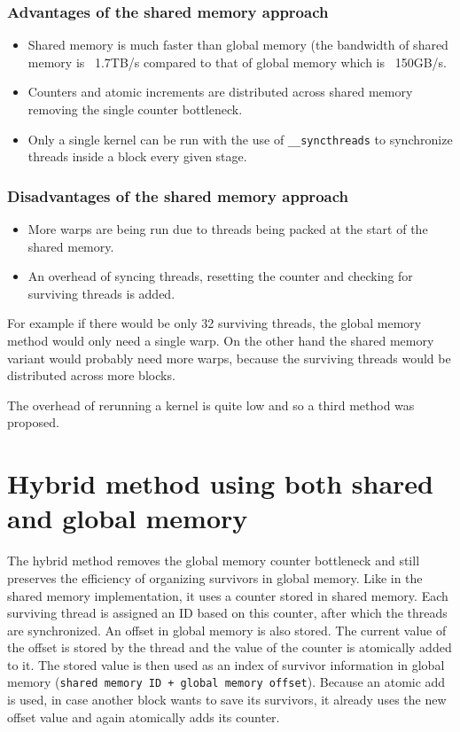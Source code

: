 \subsubsection{Advantages of the shared memory approach}

\begin{itemize}
	\item Shared memory is much faster than global memory (the bandwidth of shared memory is ~1.7TB/s compared to that of global memory which is ~150GB/s.
	\item Counters and atomic increments are distributed across shared memory removing the single counter bottleneck.
	\item Only a single kernel can be run with the use of \verb|__syncthreads| to synchronize threads inside a block every given stage.
\end{itemize}

\subsubsection{Disadvantages of the shared memory approach}

\begin{itemize}
	\item More warps are being run due to threads being packed at the start of the shared memory.
	\item An overhead of syncing threads, resetting the counter and checking for surviving threads is added.
\end{itemize}

For example if there would be only 32 surviving threads, the global memory method would only need a single warp. On the other hand the shared memory variant would probably need more warps, because the surviving threads would be distributed across more blocks.

The overhead of rerunning a kernel is quite low and so a third method was proposed.

\section{Hybrid method using both shared and global memory}

The hybrid method removes the global memory counter bottleneck and still preserves the efficiency of organizing survivors in global memory. Like in the shared memory implementation, it uses a counter stored in shared memory. Each surviving thread is assigned an ID based on this counter, after which the threads are synchronized. An offset in global memory is also stored. The current value of the offset is stored by the thread and the value of the counter is atomically added to it. The stored value is then used as an index of survivor information in global memory (\verb|shared memory ID + global memory offset|). Because an atomic add is used, in case another block wants to save its survivors, it already uses the new offset value and again atomically adds its counter.

